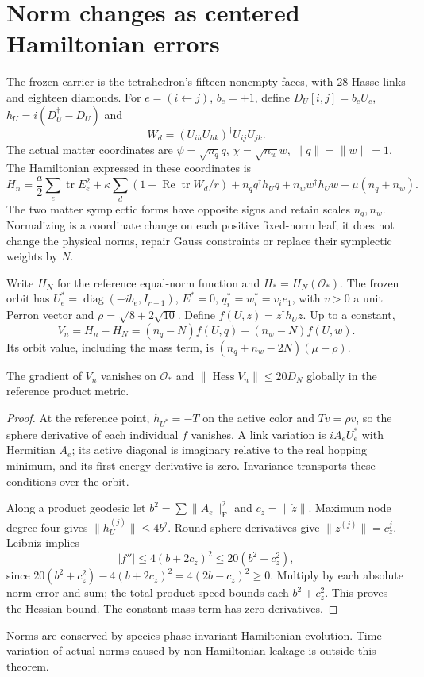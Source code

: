 \documentclass[11pt,a4paper]{article}
\newcommand{\tr}{\operatorname{tr}}\newcommand{\diag}{\operatorname{diag}}\newcommand{\Rea}{\operatorname{Re}}\newcommand{\Om}{\mathcal O_*}\newcommand{\F}{\mathrm F}
\begin{document}
\section{Norm changes as centered Hamiltonian errors}
The frozen carrier is the tetrahedron's fifteen nonempty faces, with 28 Hasse links and eighteen diamonds. For $e=(i\leftarrow j)$, $b_e=\pm1$, define $D_U[i,j]=b_eU_e$, $h_U=i(D_U^\dagger-D_U)$ and
\[
W_d=(U_{ih}U_{hk})^\dagger U_{ij}U_{jk}.
\]
The actual matter coordinates are $\psi=\sqrt{n_q}q$, $\bar\chi=\sqrt{n_w}w$, $\|q\|=\|w\|=1$. The Hamiltonian expressed in these coordinates is
\[
H_n=\frac a2\sum_e\tr E_e^2+\kappa\sum_d(1-\Rea\tr W_d/r)
+n_q q^\dagger h_Uq+n_w w^\dagger h_Uw+\mu(n_q+n_w).
\]
The two matter symplectic forms have opposite signs and retain scales $n_q,n_w$. Normalizing is a coordinate change on each positive fixed-norm leaf; it does not change the physical norms, repair Gauss constraints or replace their symplectic weights by $N$.

Write $H_N$ for the reference equal-norm function and $H_*=H_N(\Om)$. The frozen orbit has $U_e^*=\diag(-ib_e,I_{r-1})$, $E^*=0$, $q_i^*=w_i^*=v_ie_1$, with $v>0$ a unit Perron vector and $\rho=\sqrt{8+2\sqrt{10}}$. Define $f(U,z)=z^\dagger h_Uz$. Up to a constant,
\[
V_n=H_n-H_N=(n_q-N)f(U,q)+(n_w-N)f(U,w).
\]
Its orbit value, including the mass term, is $(n_q+n_w-2N)(\mu-\rho)$.
\begin{lemma}\label{lem:norm}
The gradient of $V_n$ vanishes on $\Om$ and $\|\operatorname{Hess}V_n\|\le20D_N$ globally in the reference product metric.
\end{lemma}
\begin{proof}
At the reference point, $h_{U^*}=-T$ on the active color and $Tv=\rho v$, so the sphere derivative of each individual $f$ vanishes. A link variation is $iA_eU_e^*$ with Hermitian $A_e$; its active diagonal is imaginary relative to the real hopping minimum, and its first energy derivative is zero. Invariance transports these conditions over the orbit.

Along a product geodesic let $b^2=\sum\|A_e\|_\F^2$ and $c_z=\|\dot z\|$. Maximum node degree four gives $\|h_U^{(j)}\|\le4b^j$. Round-sphere derivatives give $\|z^{(j)}\|=c_z^j$. Leibniz implies
\[
|f''|\le4(b+2c_z)^2\le20(b^2+c_z^2),
\]
since $20(b^2+c_z^2)-4(b+2c_z)^2=4(2b-c_z)^2\ge0$. Multiply by each absolute norm error and sum; the total product speed bounds each $b^2+c_z^2$. This proves the Hessian bound. The constant mass term has zero derivatives.
\end{proof}
Norms are conserved by species-phase invariant Hamiltonian evolution. Time variation of actual norms caused by non-Hamiltonian leakage is outside this theorem.
\newpage
\end{document}
